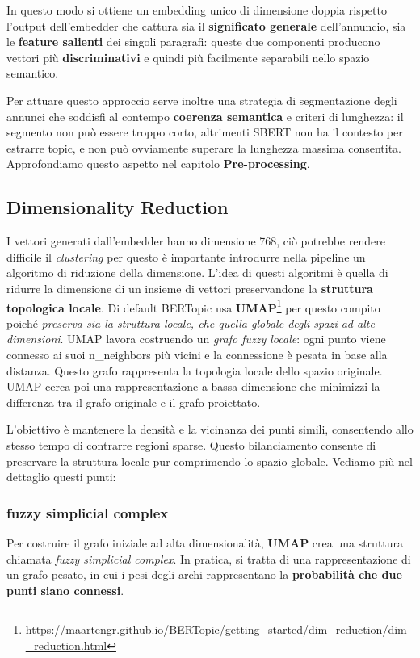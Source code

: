 In questo modo si ottiene un embedding unico di dimensione doppia rispetto l'output dell'embedder che cattura sia il \textbf{significato generale} dell'annuncio, sia le \textbf{feature salienti} dei singoli paragrafi: queste due componenti producono vettori più \textbf{discriminativi} e quindi più facilmente separabili nello spazio semantico.

Per attuare questo approccio serve inoltre una strategia di segmentazione degli annunci che soddisfi al contempo \textbf{coerenza semantica} e criteri di lunghezza: il segmento non può essere troppo corto, altrimenti SBERT non ha il contesto per estrarre topic, e non può ovviamente superare la lunghezza massima consentita. Approfondiamo questo aspetto nel capitolo \textbf{Pre-processing}.
\subsection{Dimensionality Reduction}
I vettori generati dall'embedder hanno dimensione 768, ciò potrebbe rendere difficile il \emph{clustering} per questo è importante introdurre nella pipeline un algoritmo di riduzione della dimensione.
L'idea di questi algoritmi è quella di ridurre la dimensione di un insieme di vettori preservandone la \textbf{struttura topologica locale}.
Di default BERTopic usa \textbf{UMAP}\footnote{\url{https://maartengr.github.io/BERTopic/getting_started/dim_reduction/dim_reduction.html}} per questo compito poiché \emph{preserva sia la struttura locale, che quella globale degli spazi ad alte dimensioni}.
UMAP lavora costruendo un \textit{grafo fuzzy locale}: ogni punto viene connesso ai suoi n\_neighbors più vicini e la connessione è pesata in base alla distanza. Questo grafo rappresenta la topologia locale dello spazio originale.
UMAP cerca poi una rappresentazione a bassa dimensione che minimizzi la differenza tra il grafo originale e il grafo proiettato.

L'obiettivo è mantenere la densità e la vicinanza dei punti simili, consentendo allo stesso tempo di contrarre regioni sparse.
Questo bilanciamento consente di preservare la struttura locale pur comprimendo lo spazio globale.
Vediamo più nel dettaglio questi punti:
\subsubsection{fuzzy simplicial complex}
Per costruire il grafo iniziale ad alta dimensionalità, \textbf{UMAP} crea una struttura chiamata \textit{fuzzy simplicial complex}. In pratica, si tratta di una rappresentazione di un grafo pesato, in cui i pesi degli archi rappresentano la \textbf{probabilità che due punti siano connessi}.

